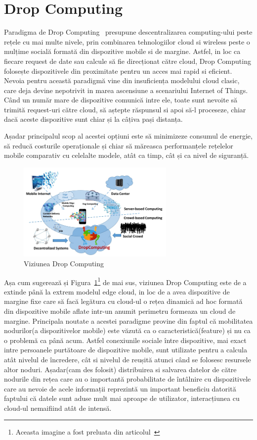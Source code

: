 \documentclass[12pt,a4paper]{report}
\begin{document}
\section{Drop Computing}
Paradigma de Drop Computing~\cite{DropComputingArticle} presupune descentralizarea computing-ului peste rețele cu mai multe nivele, prin combinarea tehnologiilor cloud si wireless peste o mulțime socială formată din dispozitive mobile si de margine. Astfel, in loc ca fiecare request de date sau calcule să fie direcționat către cloud, Drop Computing folosește dispozitivele din proximitate pentru un acces mai rapid si eficient. Nevoia pentru această paradigmă vine din insuficiența modelului cloud clasic, care deja devine nepotrivit in marea ascensiune a scenariului Internet of Things. Când un număr mare de dispozitive comunică intre ele, toate sunt nevoite să trimită request-uri către cloud, să aștepte răspunsul si apoi să-l proceseze, chiar dacă aceste dispozitive sunt chiar și la câțiva pași distanța.

Așadar principalul scop al acestei opțiuni este să minimizeze consumul de energie, să reducă costurile operaționale și chiar să măreasca performanțele rețelelor mobile comparativ cu celelalte modele, atât ca timp, cât și ca nivel de siguranță.
	
\begin{figure}[th]
\centering
\includegraphics[width=3in]{pics/dropComputing.png}
  \caption{Viziunea Drop Computing}
  \label{fig:pic2}
\end{figure}

Așa cum sugerează și Figura~\ref{fig:pic2}\footnote{Aceasta imagine a fost preluata din articolul~\cite{DropComputingArticle}} de mai sus, viziunea Drop Computing este de a extinde până la extrem modelul edge cloud, in loc de a avea dispozitive de margine fixe care să facă legătura cu cloud-ul o rețea dinamică ad hoc formată din dispozitive mobile aflate intr-un anumit perimetru formeaza un cloud de margine. Principala noutate a acestei paradigme provine din faptul că mobilitatea nodurilor(a dispozitivelor mobile) este văzută ca o caracteristică(feature) și nu ca o problemă ca până acum. Astfel conexiunile sociale între dispozitive, mai exact intre persoanele purtătoare de dispozitive mobile, sunt utilizate pentru a calcula atât nivelul de încredere, cât si nivelul de reușită atunci când se folosesc resursele altor noduri. Așadar(cam des folosit) distribuirea si salvarea datelor de către nodurile din rețea care au o importantă probabilitate de întâlnire cu dispozitivele care au nevoie de acele informații reprezintă un important beneficiu datorită faptului că datele sunt aduse mult mai aproape de utilizator, interacțiunea cu cloud-ul nemaifiind atât de intensă.
\end{document}
